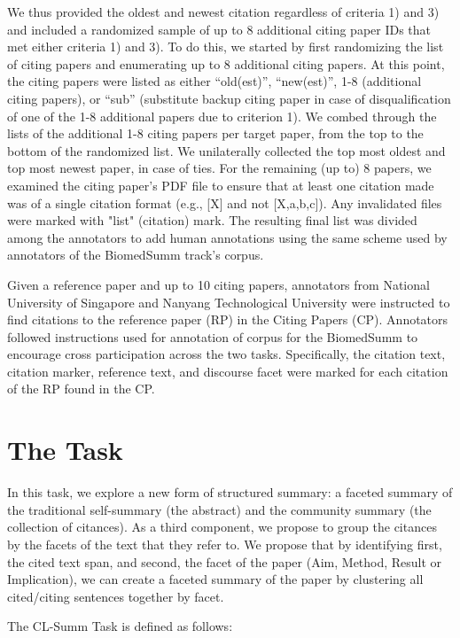 \documentclass[11pt]{article}
\begin{document}
We thus provided the oldest and newest citation regardless of criteria 
1) and 3) and included a randomized sample of up to 8 additional citing 
paper IDs that met either criteria 1) and 3). To do this, we started by 
first randomizing the list of citing papers and enumerating up to 8 
additional citing papers. At this point, the citing papers were listed 
as either ``old(est)'', ``new(est)'', 1-8 (additional citing papers),  
or ``sub'' (substitute backup citing paper in case of disqualification of 
one of the 1-8 additional papers due to criterion 1). We combed through the 
lists of the additional 1-8 citing papers per target paper, from the top to 
the bottom of the randomized list.  We unilaterally collected the top most 
oldest and top most newest paper, in case of ties.  For the remaining (up to) 
8 papers, we examined the citing paper's PDF file to ensure that at least one 
citation made was of a single citation format (e.g., [X] and not [X,a,b,c]). 
Any invalidated files were marked with "list" (citation) mark. The resulting 
final list was divided among the annotators to add human annotations using the 
same scheme used by annotators of the BiomedSumm track's corpus.

Given a reference paper and up to 10 citing papers, annotators from 
National University of Singapore and Nanyang Technological University 
were instructed to find citations to the reference paper (RP) in the 
Citing Papers (CP). Annotators followed instructions used for annotation of corpus 
for the BiomedSumm to encourage cross participation across the two tasks. 
Specifically, the citation text, citation marker, reference text, and 
discourse facet were marked for each citation of the RP found in the CP.

\section{The Task}
In this task, we explore a new form of structured summary: a faceted summary 
of the traditional self-summary (the abstract) and the community summary 
(the collection of citances).  As a third component, we propose to group the 
citances by the facets of the text that they refer to. We propose that by 
identifying first, the cited text span, and second, the facet of the paper 
(Aim, Method, Result or Implication), we can create a faceted summary of the 
paper by clustering all cited/citing sentences together by facet.

The CL-Summ Task is defined as follows:
\end{document}
